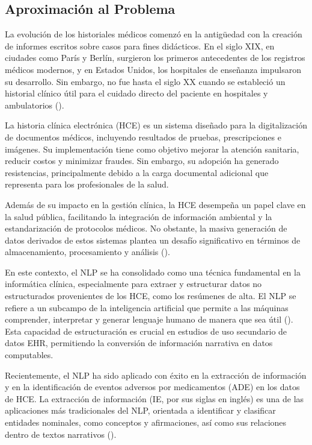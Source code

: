 \documentclass[../main.tex]{subfiles}
\begin{document}
\subsection{Aproximación al Problema}
La evolución de los historiales médicos comenzó en la antigüedad con la creación de informes escritos sobre casos para fines didácticos. En el siglo XIX, en ciudades como París y Berlín, surgieron los primeros antecedentes de los registros médicos modernos, y en Estados Unidos, los hospitales de enseñanza impulsaron su desarrollo. Sin embargo, no fue hasta el siglo XX cuando se estableció un historial clínico útil para el cuidado directo del paciente en hospitales y ambulatorios (\cite{gillum2013papyrus}). 

La historia clínica electrónica (HCE) es un sistema diseñado para la digitalización de documentos médicos, incluyendo resultados de pruebas, prescripciones e imágenes. Su implementación tiene como objetivo mejorar la atención sanitaria, reducir costos y minimizar fraudes. Sin embargo, su adopción ha generado resistencias, principalmente debido a la carga documental adicional que representa para los profesionales de la salud.

Además de su impacto en la gestión clínica, la HCE desempeña un papel clave en la salud pública, facilitando la integración de información ambiental y la estandarización de protocolos médicos. No obstante, la masiva generación de datos derivados de estos sistemas plantea un desafío significativo en términos de almacenamiento, procesamiento y análisis (\cite{cyganek2016survey}). 

En este contexto, el NLP se ha consolidado como una técnica fundamental en la informática clínica, especialmente para extraer y estructurar datos no estructurados provenientes de los HCE, como los resúmenes de alta. El NLP se refiere a un subcampo de la inteligencia artificial que permite a las máquinas comprender, interpretar y generar lenguaje humano de manera que sea útil (\cite{chopra2013natural}). Esta capacidad de estructuración es crucial en estudios de uso secundario de datos EHR, permitiendo la conversión de información narrativa en datos computables. 

Recientemente, el NLP ha sido aplicado con éxito en la extracción de información y en la identificación de eventos adversos por medicamentos (ADE) en los datos de HCE. La extracción de información (IE, por sus siglas en inglés) es una de las aplicaciones más tradicionales del NLP, orientada a identificar y clasificar entidades nominales, como conceptos y afirmaciones, así como sus relaciones dentro de textos narrativos (\cite{frey2014ehr}). 
\end{document}
